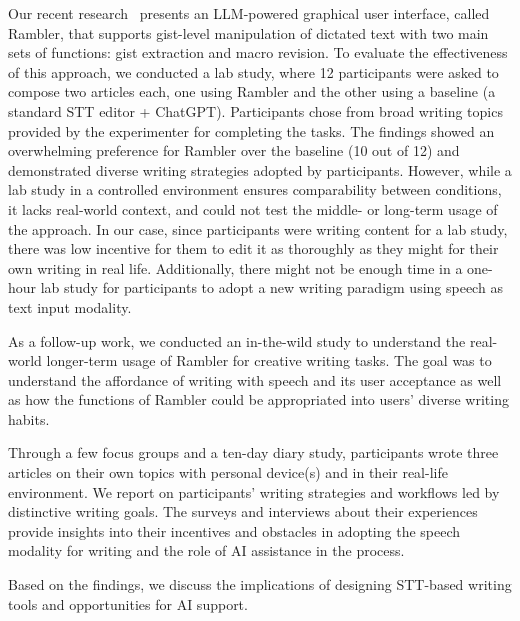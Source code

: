 Our recent research~\cite{lin2024rambler} presents an LLM-powered graphical user interface, called Rambler, that supports gist-level manipulation of dictated text with two main sets of functions: gist extraction and macro revision. To evaluate the effectiveness of this approach, we conducted a lab study, where 12 participants were asked to compose two articles each, one using Rambler and the other using a baseline (a standard STT editor + ChatGPT). Participants chose from broad writing topics provided by the experimenter for completing the tasks. The findings showed an overwhelming preference for Rambler over the baseline (10 out of 12) and demonstrated diverse writing strategies adopted by participants. However, while a lab study in a controlled environment ensures comparability between conditions, it lacks real-world context, and could not test the middle- or long-term usage of the approach. In our case, since participants were writing content for a lab study, there was low incentive for them to edit it as thoroughly as they might for their own writing in real life. Additionally, there might not be enough time in a one-hour lab study for participants to adopt a new writing paradigm using speech as text input modality. 

As a follow-up work, we conducted an in-the-wild study to understand the real-world longer-term usage of Rambler for creative writing tasks. The goal was to understand the affordance of writing with speech and its user acceptance as well as how the functions of Rambler could be appropriated into users' diverse writing habits.  

Through a few focus groups and a ten-day diary study, participants wrote three articles on their own topics with personal device(s) and in their real-life environment. We report on participants' writing strategies and workflows led by distinctive writing goals. The surveys and interviews about their experiences provide insights into their incentives and obstacles in adopting the speech modality for writing and the role of AI assistance in the process. 

Based on the findings, we discuss the implications of designing STT-based writing tools and opportunities for AI support.